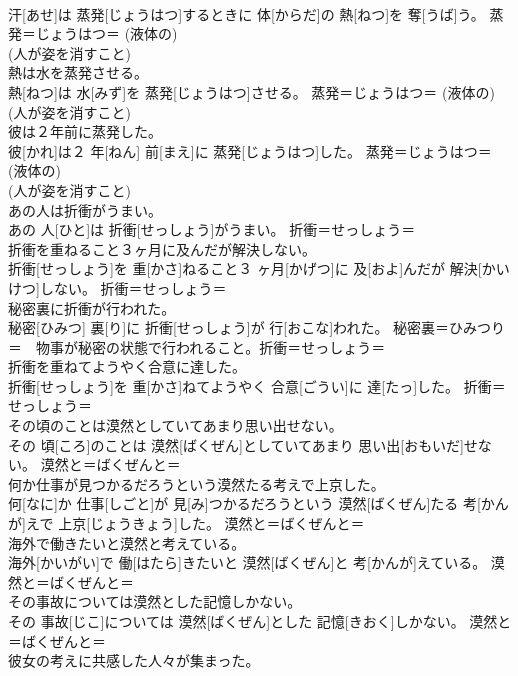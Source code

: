 \documentclass[8pt]{extreport}
\begin{document}
\begin{CJK}{UTF8}{min}
{\\	汗[あせ]は 蒸発[じょうはつ]するときに 体[からだ]の 熱[ねつ]を 奪[うば]う。	蒸発＝じょうはつ＝ (液体の) 
\\	(人が姿を消すこと) 
\\	熱は水を蒸発させる。	
\\	熱[ねつ]は 水[みず]を 蒸発[じょうはつ]させる。	蒸発＝じょうはつ＝ (液体の) 
\\	(人が姿を消すこと) 
\\	彼は２年前に蒸発した。	
\\	彼[かれ]は２ 年[ねん] 前[まえ]に 蒸発[じょうはつ]した。	蒸発＝じょうはつ＝ (液体の) 
\\	(人が姿を消すこと) 
\\	あの人は折衝がうまい。	
\\	あの 人[ひと]は 折衝[せっしょう]がうまい。	折衝＝せっしょう＝ 
\\	折衝を重ねること３ヶ月に及んだが解決しない。	
\\	折衝[せっしょう]を 重[かさ]ねること３ ヶ月[かげつ]に 及[およ]んだが 解決[かいけつ]しない。	折衝＝せっしょう＝ 
\\	秘密裏に折衝が行われた。	
\\	秘密[ひみつ] 裏[り]に 折衝[せっしょう]が 行[おこな]われた。	秘密裏＝ひみつり＝　物事が秘密の状態で行われること。折衝＝せっしょう＝ 
\\	折衝を重ねてようやく合意に達した。	
\\	折衝[せっしょう]を 重[かさ]ねてようやく 合意[ごうい]に 達[たっ]した。	折衝＝せっしょう＝ 
\\	その頃のことは漠然としていてあまり思い出せない。	
\\	その 頃[ころ]のことは 漠然[ばくぜん]としていてあまり 思い出[おもいだ]せない。	漠然と＝ばくぜんと＝ 
\\	何か仕事が見つかるだろうという漠然たる考えで上京した。	
\\	何[なに]か 仕事[しごと]が 見[み]つかるだろうという 漠然[ばくぜん]たる 考[かんが]えで 上京[じょうきょう]した。	漠然と＝ばくぜんと＝ 
\\	海外で働きたいと漠然と考えている。	
\\	海外[かいがい]で 働[はたら]きたいと 漠然[ばくぜん]と 考[かんが]えている。	漠然と＝ばくぜんと＝ 
\\	その事故については漠然とした記憶しかない。	
\\	その 事故[じこ]については 漠然[ばくぜん]とした 記憶[きおく]しかない。	漠然と＝ばくぜんと＝ 
\\	彼女の考えに共感した人々が集まった。	
}
\end{CJK}
\end{document}
